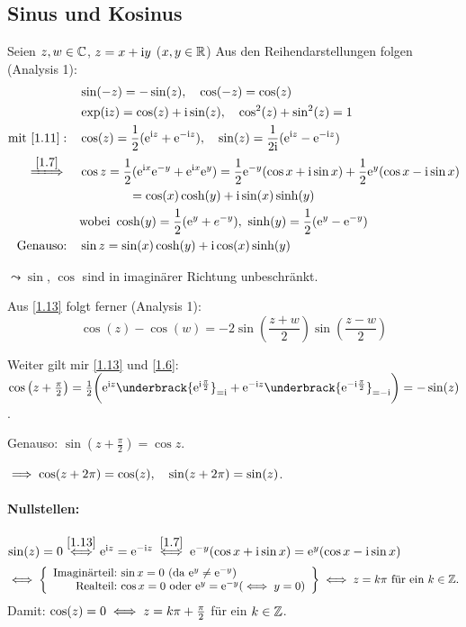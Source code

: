 \documentclass[a4paper,twoside,DIV15,BCOR12mm]{scrbook}
\begin{document}
\subsection{Sinus und Kosinus}

Seien $z,w\in\mathbb{C}$, $z = x +\mathrm{i} y$ ($x,y\in\mathbb{R}$) Aus den Reihendarstellungen folgen (Analysis 1):
\begin{align}
\label{1.11}&\sin(-z) = -\sin(z),\quad \cos(-z) = \cos(z)\\
\label{1.12}&\exp(\i z) = \cos(z)+\i\sin(z),\quad\cos^2(z)+\sin^2(z)=1\\
\label{1.13}\text{mit }\eqref{1.11}:\quad&\cos(z) = \frac{1}{2}(\e^{\i z} + \e^{-\i z}),\quad\sin(z) = \frac{1}{2\i}(\e^{\i z} - \e^{-\i z})\\
\folgtwegen{\eqref{1.7}}\quad&\cos z = \frac{1}{2}(\e^{\i x}\e^{-y}+\e^{\i x}\e^y) = \frac{1}{2}\e^{-y}(\cos x + \i\sin x) + \frac{1}{2}\e^y(\cos x-\i\sin x)\nonumber\\
&\qquad\qquad=\cos(x)\cosh(y)+\i\sin(x)\sinh(y)\label{1.14}\\
&\text{wobei } \cosh(y) = \frac{1}{2}(\e^y+e^{-y}),\ \sinh(y) = \frac{1}{2}(\e^y-\e^{-y})\nonumber\\
\label{1.15}\text{Genauso:}\quad&\sin z = \sin(x)\cosh(y) + \i\cos(x)\sinh(y)
\end{align}

$\leadsto\sin$, $\cos$ sind in imaginärer Richtung unbeschränkt.

Aus \eqref{1.13} folgt ferner (Analysis 1):
\begin{equation}\label{1.16}
\cos(z)-\cos(w) = -2\sin\left(\frac{z+w}{2}\right)\sin\left(\frac{z-w}{2}\right)
\end{equation}

Weiter gilt mir \eqref{1.13} und \eqref{1.6}: $\cos\left(z+\frac{\pi}{2}\right) = \frac{1}{2}\biggl(\e^{\i z}\underbrack{\e^{\i\frac{\pi}{2}}}_{=\i} + \e^{-\i z}\underbrack{\e^{-\i\frac{\pi}{2}}}_{=-\i}\biggr) = -\sin(z)$.

Genauso: $\sin(z+\frac{\pi}{2}) = \cos z$.

$\implies \cos (z+2\pi) = \cos (z),\quad\sin(z+2\pi)= \sin(z)$.

\paragraph{Nullstellen:} $\sin(z) = 0 \stackrel{\eqref{1.13}}{\iff} \mathrm{e}^{\mathrm{i} z} = \mathrm{e}^{-\mathrm{i} z} \stackrel{\eqref{1.7}}{\iff} \mathrm{e}^{-y} (\cos x + \mathrm{i}\sin x) = \mathrm{e}^y (\cos x -\mathrm{i}\sin x)$
\[\gdw \left\{\begin{array}{r @{:\ } l}\text{Imaginärteil}&\sin x = 0\  (\text{da } \e^y\neq\e^{-y})\\\text{Realteil}&\cos x = 0 \text{ oder } \e^y = \e^{-y} (\gdw y=0)\end{array}\right\} \gdw z = k\pi \text{ für ein } k\in\set{Z}.\]
Damit: $\cos(z) = 0\iff z = k\pi+\frac{\pi}{2}$ für ein $k\in\mathbb{Z}$.
\end{document}
